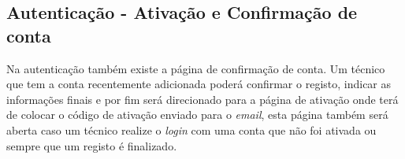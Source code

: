 \newpage

\subsection{Autenticação - Ativação e Confirmação de conta}

Na autenticação também existe a página de confirmação de conta. Um técnico que tem a conta recentemente adicionada poderá confirmar o registo, indicar as informações finais e por fim será direcionado para a página de ativação onde terá de colocar o código de ativação enviado para o \textit{email}, esta página também será aberta caso um técnico realize o \textit{login} com uma conta que não foi ativada ou sempre que um registo é finalizado.

\begin{figure}[htb]%
    \centering
    \qquad

\end{figure}
